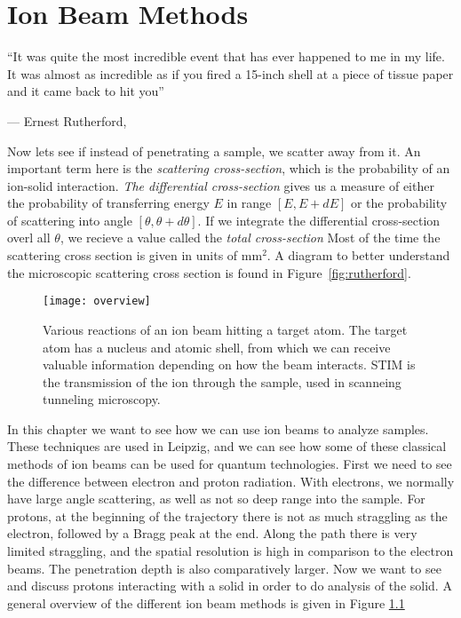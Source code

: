 
\chapter{Ion Beam Methods}\label{ch:ion-beam-methods}
\epigraphfontsize{\small\itshape}
\epigraph{ ``It was quite the most incredible event that has ever happened to me in my life. It was almost as incredible as if you fired a 15-inch shell at a piece of tissue paper and it came back to hit you''}{--- \textup{Ernest Rutherford}, \cite{2}}
Now lets see if instead of penetrating a sample, we scatter away from it.
An important term here is the \textit{scattering cross-section}, which is the probability of an ion-solid interaction.
\textit{The differential cross-section}  gives us a measure of either the probability of transferring energy $E$ in range $[E, E + dE]$ or the probability of scattering into angle $[\theta, \theta + d\theta]$. If we integrate the differential cross-section overl all $\theta$, we recieve a value called the \textit{total cross-section} Most of the time the scattering cross section is given in units of mm$^2$.
A diagram to better understand the microscopic scattering cross section is found in Figure~\ref{fig:rutherford}.

\begin{figure}
	\centering
	\texttt{[image: overview]}
	\caption{Various reactions of an ion beam hitting a target atom. The target atom has a nucleus and atomic shell, from which we can receive valuable information depending on how the beam interacts. STIM is the transmission of the ion through the sample, used in scanneing tunneling microscopy. }
	\label{fig:over}
\end{figure}
In this chapter we want to see how we can use ion beams to analyze samples.
These techniques are used in Leipzig, and we can see how some of these classical methods of ion beams can be used for quantum technologies.
First we need to see the difference between electron and proton radiation.
With electrons, we normally have large angle scattering, as well as not so deep range into the sample.
For protons, at the beginning of the trajectory there is not as much straggling as the electron, followed by a Bragg peak at the end.
Along the path there is very limited straggling, and the spatial resolution is high in comparison to the electron beams.
The penetration depth is also comparatively larger.
Now we want to see and discuss protons interacting with a solid in order to do analysis of the solid.
A general overview of the different ion beam methods is given in Figure \ref{fig:over}



